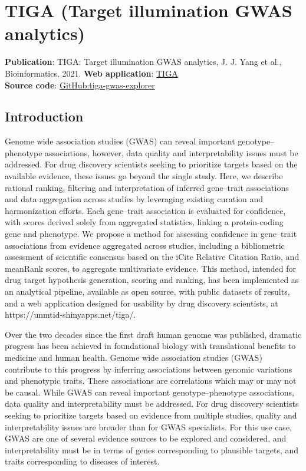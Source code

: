 \chapter{TIGA (Target illumination GWAS analytics)}

\textbf{Publication}: TIGA: Target illumination GWAS analytics, J. J. Yang et al., Bioinformatics, 2021\cite{Yang2021-di}.
\textbf{Web application}: \href{https://unmtid-shinyapps.net/tiga}{TIGA}\\
\textbf{Source code}: \href{https://github.com/unmtransinfo/tiga-gwas-explorer}{GitHub:tiga-gwas-explorer}


\section{Introduction}

Genome wide association studies (GWAS) can reveal important genotype–phenotype associations, however, data quality and interpretability issues must be addressed. For drug discovery scientists seeking to prioritize targets based on the available evidence, these issues go beyond the single study. Here, we describe rational ranking, filtering and interpretation of inferred gene–trait associations and data aggregation across studies by leveraging existing curation and harmonization efforts. Each gene–trait association is evaluated for confidence, with scores derived solely from aggregated statistics, linking a protein-coding gene and phenotype. We propose a method for assessing confidence in gene–trait associations from evidence aggregated across studies, including a bibliometric assessment of scientific consensus based on the iCite Relative Citation Ratio, and meanRank scores, to aggregate multivariate evidence. This method, intended for drug target hypothesis generation, scoring and ranking, has been implemented as an analytical pipeline, available as open source, with public datasets of results, and a web application designed for usability by drug discovery scientists, at https://unmtid-shinyapps.net/tiga/\cite{Yang2021-di}.

Over the two decades since the first draft human genome was published, dramatic progress has been achieved in foundational biology with translational benefits to medicine and human health. Genome wide association studies (GWAS) contribute to this progress by inferring associations between genomic variations and phenotypic traits\cite{Bosse2018-yl,Rusu2017-en}. These associations are correlations which may or may not be causal. While GWAS can reveal important genotype–phenotype associations, data quality and interpretability must be addressed\cite{Lambert2012-tr,Visscher2017-jp,Marigorta2018-xk,Gallagher2018-ev}.  For drug discovery scientists seeking to prioritize targets based on evidence from multiple studies, quality and interpretability issues are broader than for GWAS specialists. For this use case, GWAS are one of several evidence sources to be explored and considered, and interpretability must be in terms of genes corresponding to plausible targets, and traits corresponding to diseases of interest.

